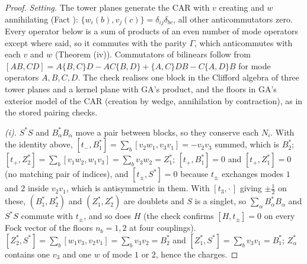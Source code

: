 \begin{proof}
\emph{Setting.} The tower planes generate the CAR with $v$ creating and $w$ annihilating (Fact ): $\{w_{i}(b), v_{j}(c)\} = \delta_{ij}\delta_{bc}$, all other anticommutators zero. Every operator below is a sum of products of an even number of mode operators except where said, so it commutes with the parity $\Gamma$, which anticommutes with each $v$ and $w$ (Theorem (iv)). Commutators of bilinears follow from $[AB, CD] = A\{B, C\}D - AC\{B, D\} + \{A, C\}DB - C\{A, D\}B$ for mode operators $A, B, C, D$. The check realises one block in the Clifford algebra of three tower planes and a kernel plane with GA's product, and the floors in GA's exterior model of the CAR (creation by wedge, annihilation by contraction), as in the stored pairing checks.

\emph{(i).} $S^{*}S$ and $B_{\alpha}^{*}B_{\alpha}$ move a pair between blocks, so they conserve each $N_{i}$. With the identity above, $[t_{-}, B_{1}^{*}] = \sum_{b}[v_{2}w_{1}, v_{3}v_{1}] = -v_{2}v_{3}$ summed, which is $B_{2}^{*}$; $[t_{+}, Z_{2}^{*}] = \sum_{b}[v_{1}w_{2}, w_{1}v_{3}] = \sum_{b}v_{3}w_{2} = Z_{1}^{*}$; $[t_{+}, B_{1}^{*}] = 0$ and $[t_{+}, Z_{1}^{*}] = 0$ (no matching pair of indices), and $[t_{\pm}, S^{*}] = 0$ because $t_{\pm}$ exchanges modes $1$ and $2$ inside $v_{2}v_{1}$, which is antisymmetric in them. With $[t_{3}, \cdot\,]$ giving $\pm\tfrac12$ on these, $(B_{1}^{*}, B_{2}^{*})$ and $(Z_{1}^{*}, Z_{2}^{*})$ are doublets and $S$ is a singlet, so $\sum_{\alpha}B_{\alpha}^{*}B_{\alpha}$ and $S^{*}S$ commute with $t_{\pm}$, and so does $H$ (the check confirms $[H, t_{\pm}] = 0$ on every Fock vector of the floors $n_{b} = 1, 2$ at four couplings). $[Z_{2}^{*}, S^{*}] = \sum_{b}[w_{1}v_{3}, v_{2}v_{1}] = \sum_{b}v_{3}v_{2} = B_{2}^{*}$ and $[Z_{1}^{*}, S^{*}] = \sum_{b}v_{3}v_{1} = B_{1}^{*}$; $Z_{\alpha}^{*}$ contains one $v_{3}$ and one $w$ of mode $1$ or $2$, hence the charges.


\end{proof}
